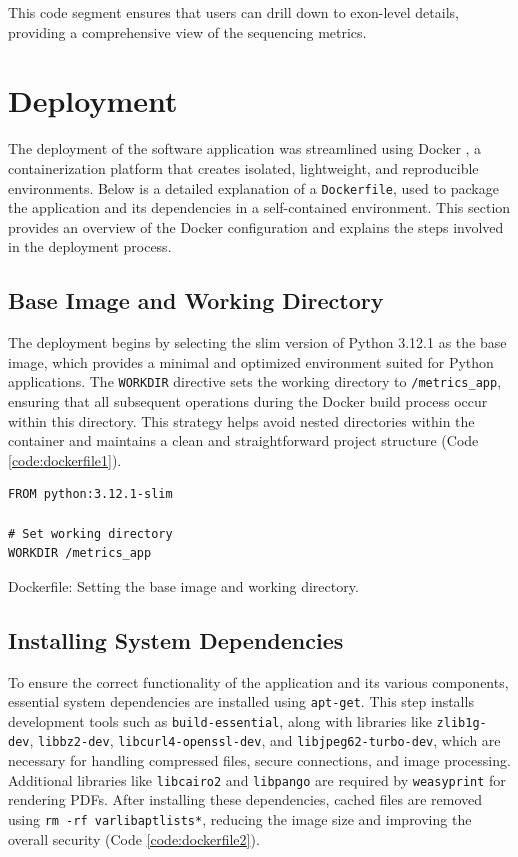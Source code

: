 This code segment ensures that users can drill down to exon-level details, providing a comprehensive view of the sequencing metrics.

\section{Deployment}

The deployment of the software application was streamlined using Docker \cite{merkel2014docker}, a containerization platform that creates isolated, lightweight, and reproducible environments. Below is a detailed explanation of a \texttt{Dockerfile}, used to package the application and its dependencies in a self-contained environment. This section provides an overview of the Docker configuration and explains the steps involved in the deployment process.

\subsection{Base Image and Working Directory}

The deployment begins by selecting the slim version of Python 3.12.1 as the base image, which provides a minimal and optimized environment suited for Python applications. The \texttt{WORKDIR} directive sets the working directory to \texttt{/metrics\_app}, ensuring that all subsequent operations during the Docker build process occur within this directory. This strategy helps avoid nested directories within the container and maintains a clean and straightforward project structure (Code \ref{code:dockerfile1}).

\begin{longlisting}
\begin{verbatim}
FROM python:3.12.1-slim

# Set working directory
WORKDIR /metrics_app
\end{verbatim}
\caption{Dockerfile: Setting the base image and working directory.}
\label{code:dockerfile1}
\end{longlisting}

\subsection{Installing System Dependencies}

To ensure the correct functionality of the application and its various components, essential system dependencies are installed using \texttt{apt-get}. This step installs development tools such as \texttt{build-essential}, along with libraries like \texttt{zlib1g-dev}, \texttt{libbz2-dev}, \texttt{libcurl4-openssl-dev}, and \texttt{libjpeg62-turbo-dev}, which are necessary for handling compressed files, secure connections, and image processing. Additional libraries like \texttt{libcairo2} and \texttt{libpango} are required by \texttt{weasyprint} for rendering PDFs. After installing these dependencies, cached files are removed using \texttt{rm -rf \/var\/lib\/apt\/lists\/*}, reducing the image size and improving the overall security (Code \ref{code:dockerfile2}).

